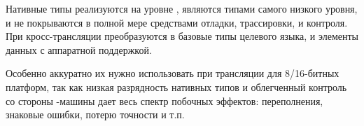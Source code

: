 
\secdown

\secdown

Нативные типы реализуются на уровне \bivm{}, 
являются типами самого низкого уровня, и не покрываются в полной мере 
средствами отладки, трассировки, и контроля. При кросс-трансляции преобразуются
в базовые типы целевого языка, и элементы данных с аппаратной 
поддержкой.

Особенно аккуратно их нужно использовать при трансляции для 8/16-битных 
платформ, так как низкая разрядность нативных типов и облегченный контроль со 
стороны \bi-машины дает весь спектр побочных эффектов: переполнения, знаковые 
ошибки, потерю точности и т.п. 


\secup

\secup
